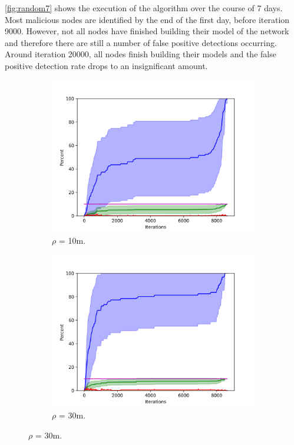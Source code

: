 \autoref{fig:random7} shows the execution of the algorithm over the course of 7 days.
Most malicious nodes are identified by the end of the first day, before iteration 9000.
However, not all nodes have finished building their model of the network and therefore there are still a number of false positive detections occurring.
Around iteration 20000, all nodes finish building their models and the false positive detection rate drops to an insignificant amount.

\begin{figure}
\centering

\begin{subfigure}{0.6\textwidth}
\includegraphics[width=\linewidth]{images/plots/Network_rA_10.0/new_plots/10_10.png}
\caption{$\rho$ = 10m.} \label{fig:tarjan0}
\end{subfigure}

\begin{subfigure}{0.6\textwidth}
\includegraphics[width=\linewidth]{images/plots/Network_rA_10.0/new_plots/30_10.png}
\caption{$\rho$ = 30m.} \label{fig:tarjan0}
\end{subfigure}


\end{figure}
